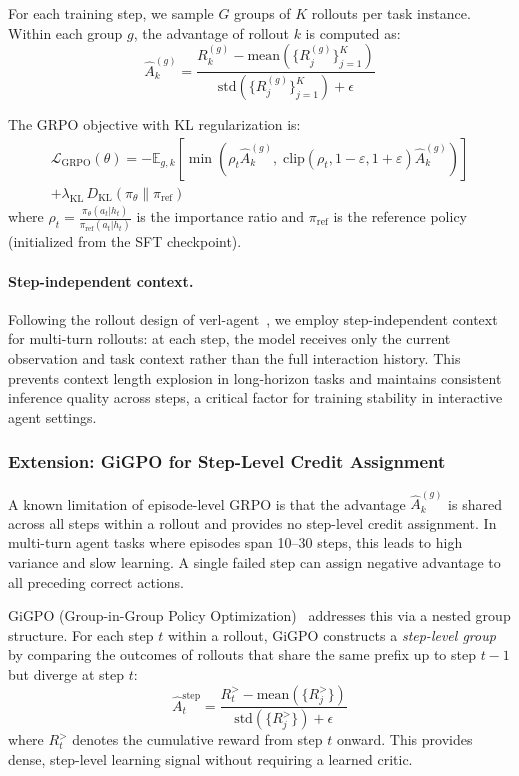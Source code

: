 For each training step, we sample $G$ groups of $K$ rollouts per task instance. Within each group $g$, the advantage of rollout $k$ is computed as:
\begin{equation}
\hat{A}^{(g)}_k = \frac{R^{(g)}_k - \text{mean}(\{R^{(g)}_j\}_{j=1}^K)}{\text{std}(\{R^{(g)}_j\}_{j=1}^K) + \epsilon}
\label{eq:grpo-advantage}
\end{equation}

The GRPO objective with KL regularization is:
\begin{multline}
\mathcal{L}_{\text{GRPO}}(\theta) = -\mathbb{E}_{g,k}\left[\min\left(\rho_t \hat{A}^{(g)}_k, \; \text{clip}(\rho_t, 1-\varepsilon, 1+\varepsilon) \hat{A}^{(g)}_k\right)\right] \\
+ \lambda_{\text{KL}} \, D_{\text{KL}}(\pi_\theta \| \pi_{\text{ref}})
\label{eq:grpo-objective}
\end{multline}
where $\rho_t = \frac{\pi_\theta(a_t | h_t)}{\pi_{\text{ref}}(a_t | h_t)}$ is the importance ratio and $\pi_{\text{ref}}$ is the reference policy (initialized from the SFT checkpoint).

\paragraph{Step-independent context.} Following the rollout design of verl-agent~\cite{selfguide2026}, we employ step-independent context for multi-turn rollouts: at each step, the model receives only the current observation and task context rather than the full interaction history. This prevents context length explosion in long-horizon tasks and maintains consistent inference quality across steps, a critical factor for training stability in interactive agent settings.

\subsubsection{Extension: GiGPO for Step-Level Credit Assignment}


A known limitation of episode-level GRPO is that the advantage $\hat{A}^{(g)}_k$ is shared across all steps within a rollout and provides no step-level credit assignment. In multi-turn agent tasks where episodes span 10--30 steps, this leads to high variance and slow learning. A single failed step can assign negative advantage to all preceding correct actions.

GiGPO (Group-in-Group Policy Optimization)~\cite{feng2025gigpo} addresses this via a nested group structure. For each step $t$ within a rollout, GiGPO constructs a \textit{step-level group} by comparing the outcomes of rollouts that share the same prefix up to step $t-1$ but diverge at step $t$:
\begin{equation}
\hat{A}^{\text{step}}_t = \frac{R_t^{>} - \text{mean}(\{R^{>}_j\})}{\text{std}(\{R^{>}_j\}) + \epsilon}
\label{eq:gigpo-advantage}
\end{equation}
where $R_t^{>}$ denotes the cumulative reward from step $t$ onward. This provides dense, step-level learning signal without requiring a learned critic.

